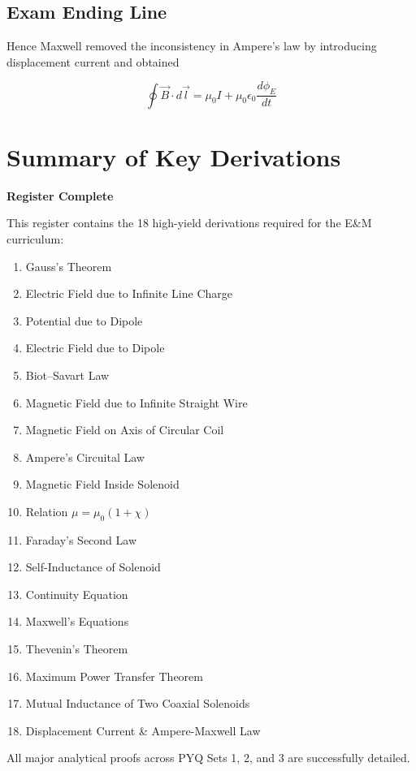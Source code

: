 \documentclass[11pt,a4paper]{article}
\begin{document}
\subsection*{Exam Ending Line}
Hence Maxwell removed the inconsistency in Ampere's law by introducing displacement current and obtained
\begin{tcolorbox}[colback=RoyalBlue!5!white, colframe=RoyalBlue]
    \[ \oint \vec{B} \cdot d\vec{l} = \mu_0 I + \mu_0\epsilon_0\frac{d\phi_E}{dt} \]
\end{tcolorbox}

\section*{Summary of Key Derivations}
\begin{tcolorbox}[colback=RoyalBlue!5!white, colframe=RoyalBlue, halign=center]
    \textbf{Register Complete \checkmark}
\end{tcolorbox}

This register contains the 18 high-yield derivations required for the E\&M curriculum:
\begin{enumerate}
    \item Gauss's Theorem
    \item Electric Field due to Infinite Line Charge
    \item Potential due to Dipole
    \item Electric Field due to Dipole
    \item Biot--Savart Law
    \item Magnetic Field due to Infinite Straight Wire
    \item Magnetic Field on Axis of Circular Coil
    \item Ampere's Circuital Law
    \item Magnetic Field Inside Solenoid
    \item Relation \( \mu = \mu_0(1+\chi) \)
    \item Faraday's Second Law
    \item Self-Inductance of Solenoid
    \item Continuity Equation
    \item Maxwell's Equations
    \item Thevenin's Theorem
    \item Maximum Power Transfer Theorem
    \item Mutual Inductance of Two Coaxial Solenoids
    \item Displacement Current \& Ampere-Maxwell Law
\end{enumerate}
All major analytical proofs across PYQ Sets 1, 2, and 3 are successfully detailed.
\end{document}
